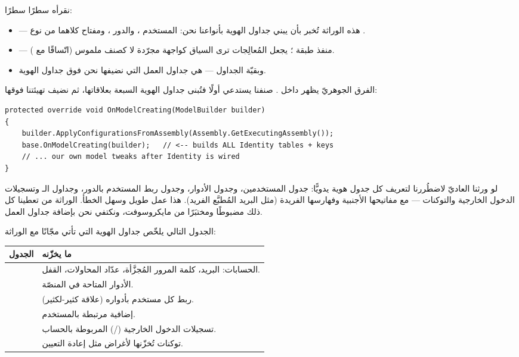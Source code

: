 نقرأه سطرًا سطرًا:
\begin{itemize}
\item {} — هذه
  الوراثة تُخبر  بأن يبني جداول الهوية بأنواعنا نحن: المستخدم
  ، والدور ، ومفتاح كلاهما من نوع
  .
\item {} — منفذ طبقة ؛ يجعل المُعالِجات
  ترى السياق كواجهة مجرّدة لا كصنف ملموس (اتّساقًا مع ).
\item {} وبقيّة الجداول — هي جداول العمل التي نضيفها نحن
  فوق جداول الهوية.
\end{itemize}

الفرق الجوهريّ يظهر داخل . صنفنا يستدعي أولًا
 فتُبنى جداول الهوية السبعة بعلاقاتها، ثم نضيف
تهيئتنا فوقها:

\begin{english}
\begin{lstlisting}[language={[Sharp]C}]
protected override void OnModelCreating(ModelBuilder builder)
{
    builder.ApplyConfigurationsFromAssembly(Assembly.GetExecutingAssembly());
    base.OnModelCreating(builder);   // <-- builds ALL Identity tables + keys
    // ... our own model tweaks after Identity is wired
}
\end{lstlisting}
\end{english}

\begin{why}
لو ورثنا  العاديّ لاضطُررنا لتعريف كل جدول هوية يدويًّا: جدول
المستخدمين، وجدول الأدوار، وجدول ربط المستخدم بالدور، وجداول الـ
وتسجيلات الدخول الخارجية والتوكنات — مع مفاتيحها الأجنبية وفهارسها الفريدة (مثل
البريد المُطبَّع الفريد). هذا عمل طويل وسهل الخطأ. الوراثة من
 تعطينا كل ذلك مضبوطًا ومختبَرًا من مايكروسوفت، ونكتفي نحن
بإضافة جداول العمل.
\end{why}

الجدول التالي يلخّص جداول الهوية التي تأتي مجّانًا مع الوراثة:

\begin{center}
\begin{tabular}{L{4.2cm} L{10.3cm}}
\toprule
{\bfseries\color{spPrimary}الجدول} & {\bfseries\color{spPrimary}ما يخزّنه} \\
\midrule
{} & الحسابات: البريد، كلمة المرور المُجزَّأة، عدّاد المحاولات، القفل. \\
 & الأدوار المتاحة في المنصّة. \\
 & ربط كل مستخدم بأدواره (علاقة كثير-لكثير). \\
 &  إضافية مرتبطة بالمستخدم. \\
 & تسجيلات الدخول الخارجية (/) المربوطة بالحساب. \\
 & توكنات تُخزّنها  لأغراض مثل إعادة التعيين. \\
\bottomrule
\end{tabular}
\end{center}

